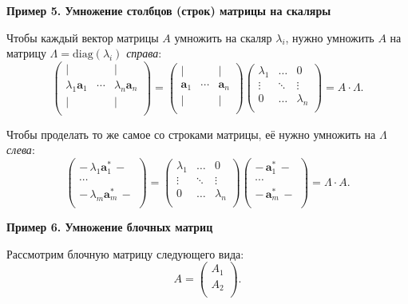 \documentclass[11pt,a4paper]{article}
\begin{document}
    \textbf{Пример 5. Умножение столбцов (строк) матрицы на скаляры}

Чтобы каждый вектор матрицы \(A\) умножить на скаляр \(\lambda_i\),
нужно умножить \(A\) на матрицу \(\Lambda = \mathrm{diag}(\lambda_i)\)
\emph{справа}: \[
  \begin{pmatrix}
    | & {} & | \\
    \lambda_1 \mathbf{a}_1 & \cdots & \lambda_n \mathbf{a}_n \\
    | & {} & | \\
  \end{pmatrix}
  =
  \begin{pmatrix}
    | & {} & | \\
    \mathbf{a}_1 & \cdots & \mathbf{a}_n \\
    | & {} & | \\
  \end{pmatrix}
  \begin{pmatrix}
    \lambda_{1} & \ldots & 0         \\
    \vdots      & \ddots & \vdots    \\
    0           & \ldots & \lambda_n \\
  \end{pmatrix}
  = A \cdot \Lambda.
\]

Чтобы проделать то же самое со строками матрицы, её нужно умножить на
\(\Lambda\) \emph{слева}: \[
  \begin{pmatrix}
    -\, \lambda_1 \mathbf{a}_1^* \,- \\
    \cdots \\
    -\, \lambda_m \mathbf{a}_m^* \,- \\
  \end{pmatrix}
  =
  \begin{pmatrix}
    \lambda_{1} & \ldots & 0         \\
    \vdots      & \ddots & \vdots    \\
    0           & \ldots & \lambda_n \\
  \end{pmatrix}
  \begin{pmatrix}
    -\, \mathbf{a}_1^* \,- \\
    \cdots \\
    -\, \mathbf{a}_m^* \,- \\
  \end{pmatrix}
  = \Lambda \cdot A.
\]

    \textbf{Пример 6. Умножение блочных матриц}

Рассмотрим блочную матрицу следующего вида:
\[ A = \begin{pmatrix} A_1 \\ A_2 \\ \end{pmatrix}. \]
\end{document}
